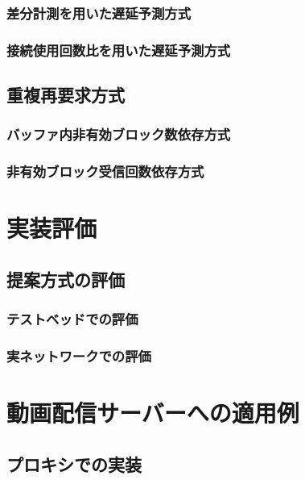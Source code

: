 \documentclass[a4j,12pt]{gradthesis_utf8}
\begin{document}
\subsection{差分計測を用いた遅延予測方式}

\subsection{接続使用回数比を用いた遅延予測方式}

\section{重複再要求方式}
\subsection{バッファ内非有効ブロック数依存方式}
\subsection{非有効ブロック受信回数依存方式}

\chapter{実装評価}\label{sec:sec4}

\section{提案方式の評価}
\subsection{テストベッドでの評価}

\subsection{実ネットワークでの評価}

\chapter{動画配信サーバーへの適用例}
\section{プロキシでの実装}
 
\end{document}
